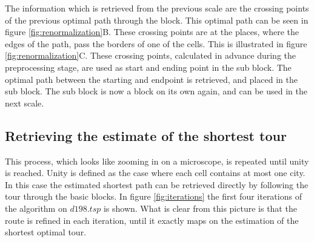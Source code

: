The information which is retrieved from the previous scale are the crossing
points of the previous optimal path through the block. This optimal path can
be seen in figure \ref{fig:renormalization}B.  These crossing points are at
the places, where the edges of the path, pass the borders of one of the cells.
This is illustrated in figure \ref{fig:renormalization}C. These crossing
points, calculated in advance during the preprocessing stage, are used as start and
ending point in the sub block. The optimal path between the starting and
endpoint is retrieved, and placed in the sub block. The sub block is now a block
on its own again, and can be used in the next scale.

\subsection{Retrieving the estimate of the shortest tour}
This process, which looks like zooming in on a microscope, is repeated until
 unity is reached. Unity is defined as the case where each cell contains at most one
city. In this case the estimated shortest path can be retrieved directly by following 
the tour through the basic blocks.
In figure \ref{fig:iterations} the first four iterations of the algorithm on
$d198.tsp$ is shown. What is clear from this picture is that the route is
refined in each iteration, until it exactly maps on the estimation  of the
shortest optimal tour.

